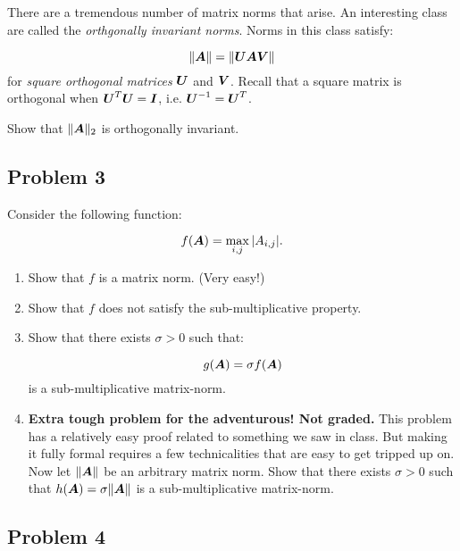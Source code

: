 \documentclass{article}
\begin{document}
There are a tremendous number of matrix norms that arise. An interesting class are called the \emph{orthgonally invariant norms}. Norms in this class satisfy:

\begin{displaymath}
\|\boldsymbol{A}\| = \|\boldsymbol{U} \boldsymbol{A} \boldsymbol{V}\|
\end{displaymath}
for \emph{square orthogonal matrices} $\boldsymbol{U}$ and $\boldsymbol{V}$. Recall that a square matrix is orthogonal when $\boldsymbol{U}^T \boldsymbol{U} = \boldsymbol{I}$, i.e. $\boldsymbol{U}^{-1} = \boldsymbol{U}^T$.

Show that $\| \boldsymbol{A} \|_2$ is orthogonally invariant.

\hypertarget{problem_3_5}{}\subsection*{{Problem 3}}\label{problem_3_5}

Consider the following function:

\begin{displaymath}
f(\boldsymbol{A}) = \max_{i,j} |A_{i,j}|.
\end{displaymath}
\begin{enumerate}%
\item Show that $f$ is a matrix norm. (Very easy!)


\item Show that $f$ does not satisfy the sub-multiplicative property.


\item Show that there exists $\sigma > 0$ such that:

\begin{displaymath}
g(\boldsymbol{A}) = \sigma f(\boldsymbol{A})
\end{displaymath}
is a sub-multiplicative matrix-norm.


\item \textbf{Extra tough problem for the adventurous! Not graded.} This problem has a relatively easy proof related to something we saw in class. But making it fully formal requires a few technicalities that are easy to get tripped up on. Now let $\|\boldsymbol{A}\|$ be an arbitrary matrix norm. Show that there exists $\sigma > 0$ such that $h(\boldsymbol{A}) = \sigma \|\boldsymbol{A}\|$ is a sub-multiplicative matrix-norm.



\end{enumerate}
\hypertarget{problem_4_6}{}\subsection*{{Problem 4}}\label{problem_4_6}
\end{document}
